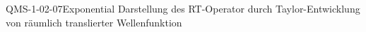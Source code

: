 
\begin{PROP}{QMS-1-02-07}{Exponential Darstellung des RT-Operator durch Taylor-Entwicklung von räumlich translierter Wellenfunktion}
\end{PROP}

